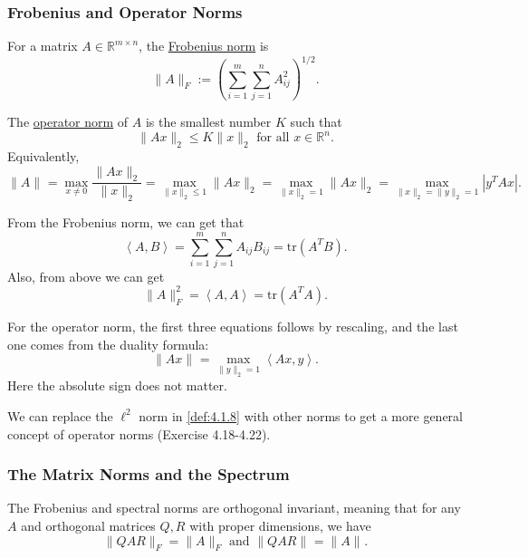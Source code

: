 \subsubsection{Frobenius and Operator Norms}
\begin{definition}[]
\label{def:4.1.8}
For a matrix $A \in \mathbb{R}^{m \times n}$, the \underline{Frobenius norm} is 
\[ \lVert A \rVert_{F} := \left( \sum_{i = 1}^{m} \sum_{j = 1}^{n} A_{ij}^2 \right)^{1/2}. \]

The \underline{operator norm} of $A$ is the smallest number $K$ such that 
\[ \lVert Ax \rVert_{2} \leq K \lVert x \rVert_{2} \text{ for all } x \in \mathbb{R}^n. \]
Equivalently, 
\[ \lVert A \rVert_{} = \max_{x \neq 0} \frac{\lVert Ax \rVert_{2}}{\lVert x \rVert_{2}} 
= \max_{\lVert x \rVert_{2} \leq 1} \lVert Ax \rVert_{2} 
= \max_{\lVert x \rVert_{2} = 1} \lVert Ax \rVert_{2} 
= \max_{\lVert x \rVert_{2} = \lVert y \rVert_{2} = 1} |y^T Ax|. \]
\end{definition}
From the Frobenius norm, we can get that 
\[ \left\langle A, B \right\rangle = \sum_{i = 1}^{m} \sum_{j = 1}^{n} A_{ij} B_{ij} = \mathrm{tr}(A^T B). \]
Also, from above we can get 
\[ \lVert A \rVert_{F}^2 = \left\langle A, A \right\rangle = \mathrm{tr}(A^T A). \]

For the operator norm, the first three equations follows by rescaling, and the last one comes from the 
duality formula: 
\[ \lVert Ax \rVert_{} = \max_{\lVert y \rVert_{2} = 1} \left\langle Ax, y \right\rangle. \]
Here the absolute sign does not matter.

\begin{remark}
\label{rmk:4.1.9}
We can replace the $\ell^2$ norm in \cref{def:4.1.8} with other norms to get a more general concept of 
operator norms (Exercise 4.18-4.22).
\end{remark}

\subsubsection{The Matrix Norms and the Spectrum}
\begin{lemma}
\label{lem:4.1.10}
The Frobenius and spectral norms are orthogonal invariant, meaning that for any $A$ and orthogonal matrices 
$Q, R$ with proper dimensions, we have 
\[ \lVert QAR \rVert_{F} = \lVert A \rVert_{F} \text{ and } \lVert QAR \rVert_{} = \lVert A \rVert_{}. \]
\end{lemma}


